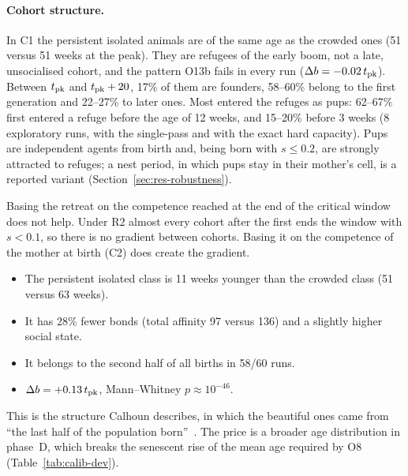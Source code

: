 \paragraph{Cohort structure.}
In \textsf{C1} the persistent isolated animals are of the same age as the crowded ones (51 versus 51
weeks at the peak). They are refugees of the early boom, not a late, unsocialised cohort, and the
pattern O13b fails in every run ($\Delta b=-0.02\,t_{\rm pk}$). Between $t_{\rm pk}$ and $t_{\rm pk}+20$, 17\% of them
are founders, 58--60\% belong to the first generation and 22--27\% to later ones. Most entered the refuges as pups:
62--67\% first entered a refuge before the age of 12 weeks, and 15--20\% before 3 weeks (8 exploratory runs, with
the single-pass and with the exact hard capacity). Pups are independent agents from birth and, being born with $s\le0.2$, are
strongly attracted to refuges; a nest period, in which pups stay in their mother's cell, is a reported
variant (Section~\ref{sec:res-robustness}).

Basing the retreat on the competence reached at the end of the critical window does not help. Under R2
almost every cohort after the first ends the window with $s<0.1$, so there is no gradient between
cohorts. Basing it on the competence of the mother at birth (\textsf{C2}) does create the gradient.
\begin{itemize}
  \item The persistent isolated class is 11 weeks younger than the crowded class (51 versus 63 weeks).
  \item It has 28\% fewer bonds (total affinity 97 versus 136) and a slightly higher social state.
  \item It belongs to the second half of all births in 58/60 runs.
  \item $\Delta b=+0.13\,t_{\rm pk}$, Mann--Whitney $p\approx10^{-46}$.
\end{itemize}
This is the structure Calhoun describes, in which the beautiful ones came from ``the last half of the
population born''~\cite{Calhoun1973}. The price is a broader age distribution in phase~D, which breaks
the senescent rise of the mean age required by O8 (Table~\ref{tab:calib-dev}).

